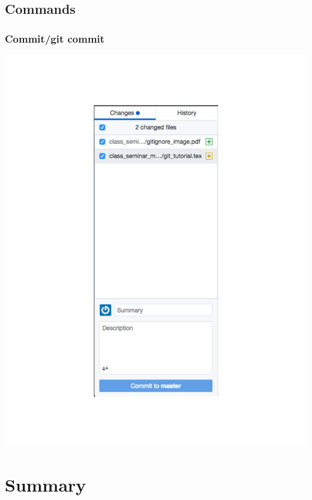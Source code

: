 \documentclass[]{beamer}
\begin{document}
\subsection{Commands}
\begin{frame}[t]\frametitle{Commit/git commit}
\centering
\includegraphics[scale = 0.30,trim={2.49in 1.39in 2.49in 1.39in},clip]{figures/commit_image.pdf}
\end{frame}

\section{Summary}
\end{document}
